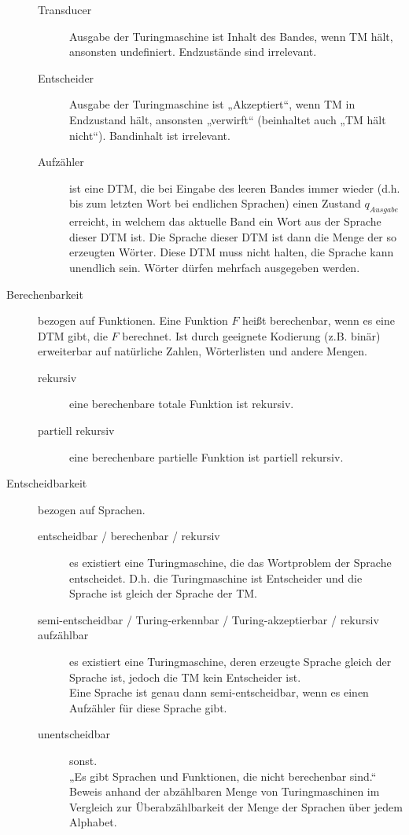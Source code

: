 \begin{description}
\begin{description}
                \item[Transducer] Ausgabe der Turingmaschine ist Inhalt des Bandes, wenn TM hält, ansonsten undefiniert. Endzustände sind irrelevant.
                \item[Entscheider] Ausgabe der Turingmaschine ist „Akzeptiert“, wenn TM in Endzustand hält, ansonsten „verwirft“ (beinhaltet auch „TM hält nicht“). Bandinhalt ist irrelevant.
                \item[Aufzähler] ist eine DTM, die bei Eingabe des leeren Bandes immer wieder (d.h. bis zum letzten Wort bei endlichen Sprachen) einen Zustand $q_{Ausgabe}$ erreicht, in welchem das aktuelle Band ein Wort aus der Sprache dieser DTM ist. Die Sprache dieser DTM ist dann die Menge der so erzeugten Wörter. Diese DTM muss nicht halten, die Sprache kann unendlich sein. Wörter dürfen mehrfach ausgegeben werden.
            \end{description}

        \item[Berechenbarkeit] bezogen auf Funktionen. Eine Funktion $F$ heißt berechenbar, wenn es eine DTM gibt, die $F$ berechnet. Ist durch geeignete Kodierung (z.B. binär) erweiterbar auf natürliche Zahlen, Wörterlisten und andere Mengen. 
            \begin{description}
                \item[rekursiv] eine berechenbare totale Funktion ist rekursiv.
                \item[partiell rekursiv] eine berechenbare partielle Funktion ist partiell rekursiv.
            \end{description}

        \item[Entscheidbarkeit] bezogen auf Sprachen. 
            \begin{description}
                \item[entscheidbar / berechenbar / rekursiv] es existiert eine Turingmaschine, die das Wortproblem der Sprache entscheidet. D.h. die Turingmaschine ist Entscheider und die Sprache ist gleich der Sprache der TM.
                \item[semi-entscheidbar / Turing-erkennbar / Turing-akzeptierbar / rekursiv aufzählbar] es existiert eine Turingmaschine, deren erzeugte Sprache gleich der Sprache ist, jedoch die TM kein Entscheider ist. \\
                Eine Sprache ist genau dann semi-entscheidbar, wenn es einen Aufzähler für diese Sprache gibt.
                \item[unentscheidbar] sonst. \\
                    „Es gibt Sprachen und Funktionen, die nicht berechenbar sind.“ Beweis anhand der abzählbaren Menge von Turingmaschinen im Vergleich zur Überabzählbarkeit der Menge der Sprachen über jedem Alphabet.
            \end{description}


\end{description}

